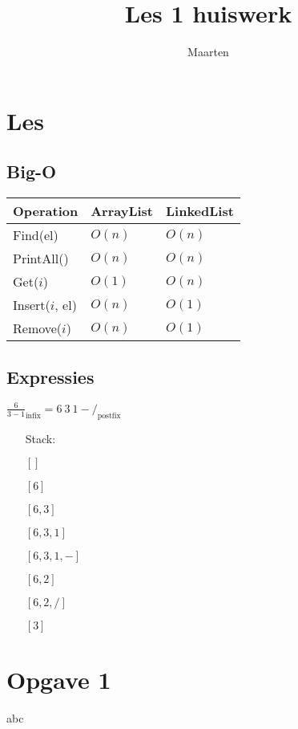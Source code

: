 \documentclass[12pt,a4paper]{article}
\title{Les 1 huiswerk}
\author{Maarten}
\begin{document}
\maketitle
\section{Les}
\subsection{Big-O}

\begin{tabular}{l|l|l}
Operation & ArrayList & LinkedList \\
\hline
Find(el)        & $O(n)$ & $O(n)$ \\
PrintAll()      & $O(n)$ & $O(n)$ \\
Get($i$)        & $O(1)$ & $O(n)$ \\
Insert($i$, el) & $O(n)$ & $O(1)$ \\
Remove($i$)     & $O(n)$ & $O(1)$ \\
\end{tabular}

\subsection{Expressies}
$\frac{6}{3-1}_\text{infix} = 6\ 3\ 1 - /_\text{postfix}$
\begin{itemize}
\item[Stack:]
\item[] $[]$
\item[] $[6]$
\item[] $[6,3]$
\item[] $[6,3,1]$
\item[] $[6,3,1,-]$
\item[] $[6,2]$
\item[] $[6,2,/]$
\item[] $[3]$
\end{itemize}

\section{Opgave 1}
abc
\end{document}
